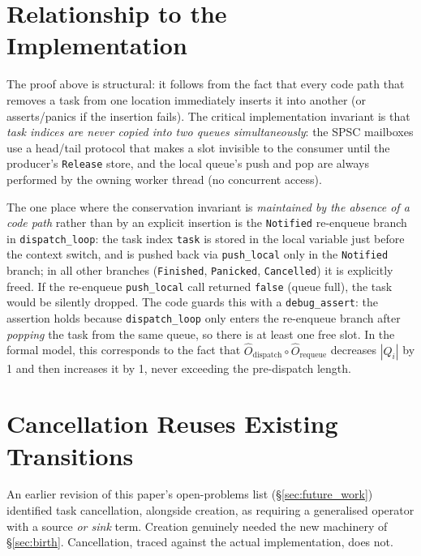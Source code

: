\documentclass[11pt,a4paper]{report}
\newcommand{\code}[1]{\texttt{#1}}
\begin{document}
\section{Relationship to the Implementation}

The proof above is structural: it follows from the fact that every
code path that removes a task from one location immediately inserts it
into another (or asserts/panics if the insertion fails).  The critical
implementation invariant is that \emph{task indices are never copied
into two queues simultaneously}: the SPSC mailboxes use a
head/tail protocol that makes a slot invisible to the consumer until
the producer's \code{Release} store, and the local queue's push and
pop are always performed by the owning worker thread (no concurrent
access).

The one place where the conservation invariant is \emph{maintained
by the absence of a code path} rather than by an explicit insertion
is the \code{Notified} re-enqueue branch in \code{dispatch\_loop}:
the task index \code{task} is stored in the local variable just before
the context switch, and is pushed back via \code{push\_local} only in
the \code{Notified} branch; in all other branches (\code{Finished},
\code{Panicked}, \code{Cancelled}) it is explicitly freed.  If the re-enqueue
\code{push\_local} call returned \code{false} (queue full), the task
would be silently dropped.  The code guards this with a
\code{debug\_assert}: the assertion holds because
\code{dispatch\_loop} only enters the re-enqueue branch after
\emph{popping} the task from the same queue, so there is at least one
free slot.  In the formal model, this corresponds to the fact that
$\hat{O}_{\text{dispatch}} \circ \hat{O}_{\text{requeue}}$ decreases
$|Q_i|$ by 1 and then increases it by 1, never exceeding the
pre-dispatch length.

\section{Cancellation Reuses Existing Transitions}
\label{sec:cancel-reuse}

An earlier revision of this paper's open-problems list
(\S\ref{sec:future_work}) identified task cancellation, alongside
creation, as requiring a generalised operator with a source \emph{or
sink} term. Creation genuinely needed the new machinery of
\S\ref{sec:birth}. Cancellation, traced against the actual
implementation, does not.
\end{document}
